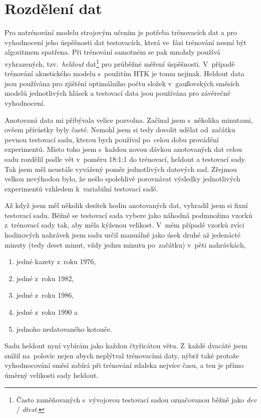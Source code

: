\section{Rozdělení dat}
\label{sec:asr:rozdeleni-dat}

Pro natrénování modelu strojovým učením je potřeba trénovacích dat a pro
vyhodnocení jeho úspěšnosti dat testovacích, která ve~fázi trénování nesmí být
algoritmem spatřena. Při trénování samotném se pak mnohdy používá vyhrazených,
tzv.~\textit{heldout} dat\footnote{Často zaměňovaných s~vývojovou testovací sadou
označovanou běžně jako \textit{dev} / \textit{dtest}.} pro průběžné měření úspěšnosti. V~případě trénování
akustického modelu s~použitím HTK je tomu nejinak. Heldout data jsou používána
pro zjištění optimálního počtu složek v~gaußovských směsích modelů jednotlivých hlásek a testovací
data jsou používána pro závěrečné vyhodnocení.

Anotovaná data mi přibývala velice pozvolna. Začínal jsem s~několika minutami,
ovšem přírůstky byly časté. Nemohl jsem si tedy dovolit udělat od~začátku pevnou
testovací sadu, kterou bych používal po~celou dobu provádění experimentů. Místo
toho jsem s~každou novou dávkou anotovaných dat celou sadu rozdělil podle vět
v~poměru 18:1:1 do trénovací, heldout a testovací sady. Tak jsem měl neustále
vyvážený poměr jednotlivých datových sad. Zřejmou velkou nevýhodou bylo, že
nešlo spolehlivě porovnávat výsledky jednotlivých experimentů vzhledem
k~variabilní testovací sadě.

Až když jsem měl několik desítek hodin anotovaných dat, vyhradil jsem si fixní
testovací sadu. Běžně se testovací sada vybere jako náhodná podmnožina vzorků
z~trénovací sady tak, aby měla kýženou velikost. V~mém případě vzorků zvíci
hodinových nahrávek jsem sadu určil manuálně jako úsek druhé až jedenácté minuty
(tedy deset minut, vždy jednu minutu po~začátku) v~pěti nahrávkách,
\begin{enumerate}
\item{jedné kazety z~roku 1976,}
\item{jedné z~roku 1982,}
\item{jedné z~roku 1986,}
\item{jedné z~roku 1990 a}
\item{jednoho nedatovaného kotouče.}
\end{enumerate}

Sadu heldout nyní vybírám jako každou čtyřicátou větu. Z~každé dvacáté jsem
snížil na~polovic nejen abych neplýtval trénovacími daty, nýbrž také protože
vyhodnocování směsí zabírá při trénování zdaleka nejvíce času, a ten je přímo
úměrný velikosti sady heldout.

